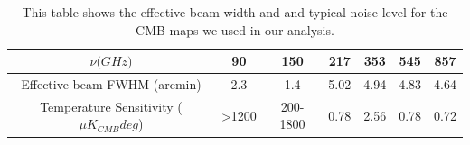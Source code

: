 \documentclass{princeton_astro_thesis}
\begin{document}


\begin{table}[h!]
\centering
\begin{tabular}{||c c c c c c c||} 
 \hline
$\nu \mathrm(GHz)$ & 90 & 150 & 217 & 353 & 545 & 857 \\ [0.5ex] 
 \hline\hline  %
Effective beam FWHM (arcmin) & 2.3 & 1.4 & 5.02 &  4.94 &  4.83 &  4.64\\[0.25 cm] 
Temperature Sensitivity ($\mu K_{CMB} deg$) & >1200 & 200-1800 & 0.78 & 2.56 & 0.78 & 0.72\\ [1ex] 
 \hline
\end{tabular}
\caption{This table shows the effective beam width and and typical noise level for the CMB maps we used in our analysis.}
\label{table:1}
\end{table}
\end{document}
